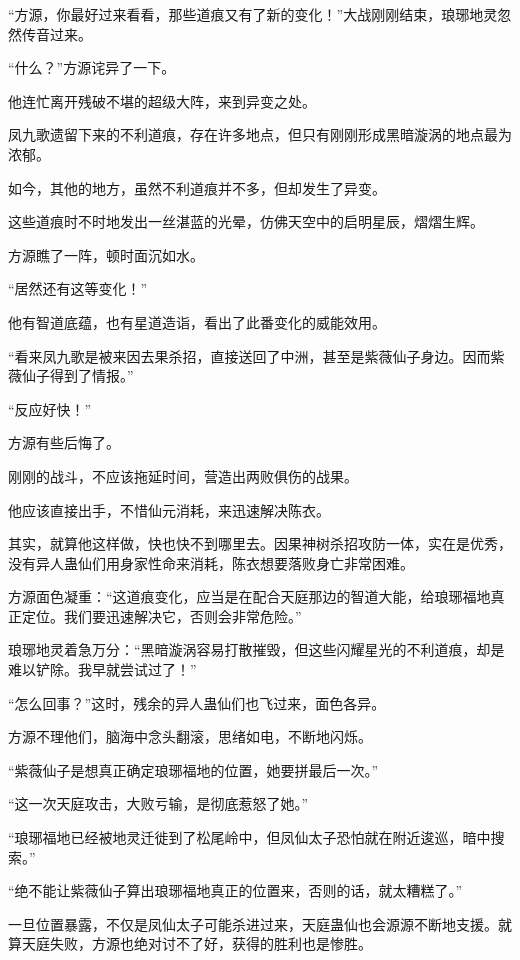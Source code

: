 
\begin{this_body}

“方源，你最好过来看看，那些道痕又有了新的变化！”大战刚刚结束，琅琊地灵忽然传音过来。

“什么？”方源诧异了一下。

他连忙离开残破不堪的超级大阵，来到异变之处。

凤九歌遗留下来的不利道痕，存在许多地点，但只有刚刚形成黑暗漩涡的地点最为浓郁。

如今，其他的地方，虽然不利道痕并不多，但却发生了异变。

这些道痕时不时地发出一丝湛蓝的光晕，仿佛天空中的启明星辰，熠熠生辉。

方源瞧了一阵，顿时面沉如水。

“居然还有这等变化！”

他有智道底蕴，也有星道造诣，看出了此番变化的威能效用。

“看来凤九歌是被来因去果杀招，直接送回了中洲，甚至是紫薇仙子身边。因而紫薇仙子得到了情报。”

“反应好快！”

方源有些后悔了。

刚刚的战斗，不应该拖延时间，营造出两败俱伤的战果。

他应该直接出手，不惜仙元消耗，来迅速解决陈衣。

其实，就算他这样做，快也快不到哪里去。因果神树杀招攻防一体，实在是优秀，没有异人蛊仙们用身家性命来消耗，陈衣想要落败身亡非常困难。

方源面色凝重：“这道痕变化，应当是在配合天庭那边的智道大能，给琅琊福地真正定位。我们要迅速解决它，否则会非常危险。”

琅琊地灵着急万分：“黑暗漩涡容易打散摧毁，但这些闪耀星光的不利道痕，却是难以铲除。我早就尝试过了！”

“怎么回事？”这时，残余的异人蛊仙们也飞过来，面色各异。

方源不理他们，脑海中念头翻滚，思绪如电，不断地闪烁。

“紫薇仙子是想真正确定琅琊福地的位置，她要拼最后一次。”

“这一次天庭攻击，大败亏输，是彻底惹怒了她。”

“琅琊福地已经被地灵迁徙到了松尾岭中，但凤仙太子恐怕就在附近逡巡，暗中搜索。”

“绝不能让紫薇仙子算出琅琊福地真正的位置来，否则的话，就太糟糕了。”

一旦位置暴露，不仅是凤仙太子可能杀进过来，天庭蛊仙也会源源不断地支援。就算天庭失败，方源也绝对讨不了好，获得的胜利也是惨胜。


\end{this_body}

